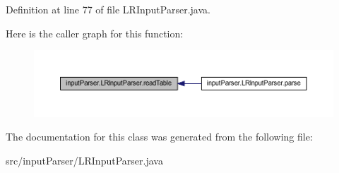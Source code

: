Definition at line 77 of file L\-R\-Input\-Parser.\-java.



Here is the caller graph for this function\-:\nopagebreak
\begin{figure}[H]
\begin{center}
\leavevmode
\includegraphics[width=350pt]{classinput_parser_1_1_l_r_input_parser_a1ade16089652dc354434e1ddb1769e96_icgraph}
\end{center}
\end{figure}




The documentation for this class was generated from the following file\-:\begin{DoxyCompactItemize}
\item 
src/input\-Parser/L\-R\-Input\-Parser.\-java\end{DoxyCompactItemize}
